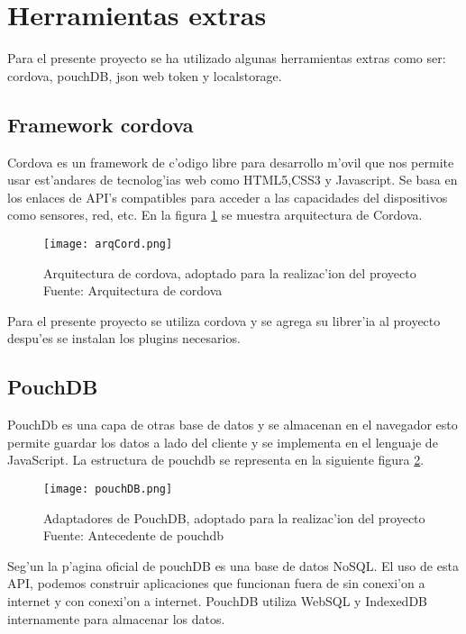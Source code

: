 \section{Herramientas extras}
Para el presente proyecto se ha utilizado algunas herramientas extras como ser: cordova, pouchDB, json web token y localstorage.

\subsection{Framework cordova}
Cordova es un framework de c'odigo libre para desarrollo m'ovil que nos permite usar est'andares de tecnolog'ias web como HTML5,CSS3 y Javascript. Se basa en los enlaces de API's compatibles para acceder a las capacidades del dispositivos como sensores, red, etc. En la figura \ref{fig:arqCordova} se muestra arquitectura de Cordova.

\begin{figure}[H]
\centering
\texttt{[image: arqCord.png]}
\captionsetup{justification=centering,margin=2cm}
\caption{Arquitectura de cordova, adoptado para la realizac'ion del proyecto Fuente: Arquitectura de cordova\cite{Cantabriatic}}
\label{fig:arqCordova}
\end{figure}

Para el presente proyecto se utiliza cordova y se agrega su librer'ia al proyecto despu'es se instalan los plugins necesarios.

\subsection{PouchDB}
PouchDb es una capa de otras base de datos y se almacenan en el navegador esto permite guardar los datos a lado del cliente y se implementa en el lenguaje de JavaScript. La estructura de pouchdb se representa en la siguiente figura \ref{fig:pouchDB}.\cite{Pouch} 
\begin{figure}[H]
\centering
\texttt{[image: pouchDB.png]}
\captionsetup{justification=centering,margin=2cm}
\caption{Adaptadores de PouchDB, adoptado para la realizac'ion del proyecto Fuente: Antecedente de pouchdb\cite{Pouch}}
\label{fig:pouchDB}
\end{figure}

Seg'un la p'agina oficial de pouchDB es una base de datos NoSQL. El uso de esta API, podemos construir aplicaciones que funcionan fuera de sin conexi'on a internet y con conexi'on a internet. PouchDB utiliza WebSQL y IndexedDB internamente para almacenar los datos. 

